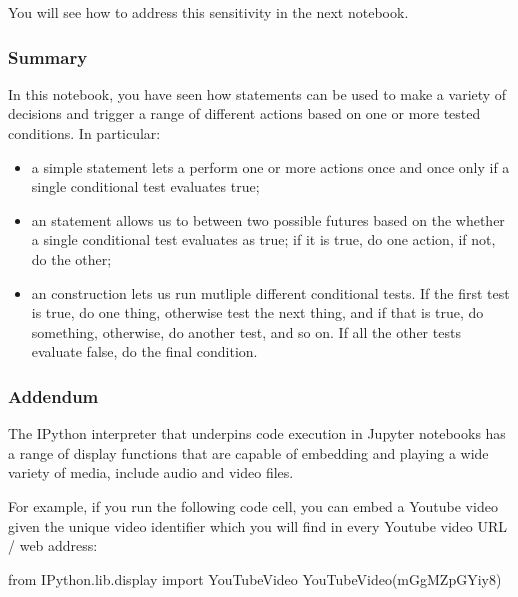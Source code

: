 \documentclass[letterpaper,10pt,english]{sphinxmanual}
\begin{document}
You will see how to address this sensitivity in the next notebook.


\subsubsection{Summary}
\label{\detokenize{content/02_Robot_Lab/Section_00_02:Summary}}
In this notebook, you have seen how  statements can be used to make a variety of decisions and trigger a range of different actions based on one or more tested conditions. In particular:
\begin{itemize}
\item {} 
a simple  statement lets a perform one or more actions once and once only if a single conditional test evaluates true;

\item {} 
an  statement allows us to  between two possible futures based on the whether a single conditional test evaluates as true; if it is true, do one action, if not, do the other;

\item {} 
an  construction lets us run mutliple different conditional tests. If the first test is true, do one thing, otherwise test the next thing, and if that is true, do something, otherwise, do another test, and so on. If all the other  tests evaluate false, do the final  condition.

\end{itemize}


\subsubsection{Addendum}
\label{\detokenize{content/02_Robot_Lab/Section_00_02:Addendum}}
The IPython interpreter that underpins code execution in Jupyter notebooks has a range of display functions that are capable of embedding and playing a wide variety of media, include audio and video files.

For example, if you run the following code cell, you can embed a Youtube video given the unique video identifier which you will find in every Youtube video URL / web address:

{
\begin{sphinxVerbatim}[commandchars=\\\{\}]
\llap{\color{nbsphinxin}[ ]:\,\hspace{\fboxrule}\hspace{\fboxsep}}from IPython.lib.display import YouTubeVideo
YouTubeVideo(\PYGZsq{}mGgMZpGYiy8\PYGZsq{})
\end{sphinxVerbatim}
}
\end{document}
